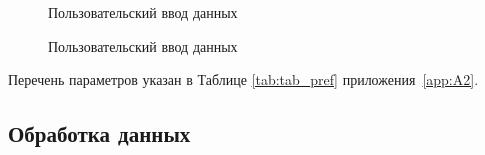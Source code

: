 \begin{figure}[ht]
    \caption{Пользовательский ввод данных}\label{fig:ui-5}
\end{figure}

\begin{figure}[ht]
    \caption{Пользовательский ввод данных}\label{fig:ui-6}
\end{figure}


Перечень параметров указан в Таблице \cref{tab:tab_pref} приложения~\cref{app:A2}.

\subsection{Обработка данных}\label{subsec:ch3/sec3/sub2}

